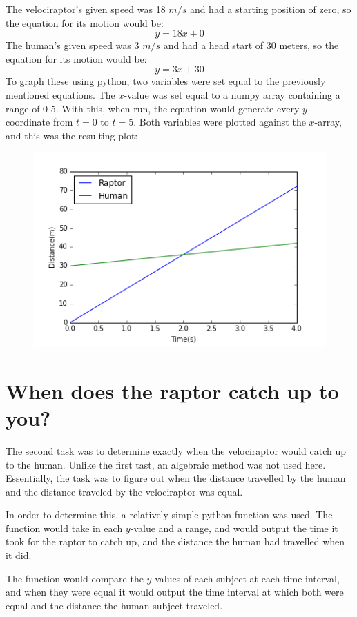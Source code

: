 \documentclass[twocolumn]{revtex4}
\begin{document}
	The velociraptor's given speed was 18 $m/s$ and had a starting position of zero, so the equation for its motion would be:
	$$y=18x+0$$
	The human's given speed was 3 $m/s$ and had a head start of 30 meters, so the equation for its motion would be:
	$$y=3x+30$$
	To graph these using python, two variables were set equal to the previously mentioned equations. The $x$-value was set equal to a numpy array containing a range of 0-5. With this, when run, the equation would generate every $y$-coordinate from $t=0$ to $t=5$. Both variables were plotted against the $x$-array, and this was the resulting plot:
	\begin{figure}
		\centering
		\includegraphics[width=.9\linewidth]{./graph1}
		\label{fig:graph1}
	\end{figure}
\section{When does the raptor catch up to you?}

	The second task was to determine exactly when the velociraptor would catch up to the human. Unlike the first tast, an algebraic method was not used here. Essentially, the task was to figure out when the distance travelled by the human and the distance traveled by the velociraptor was equal.
	
	In order to determine this, a relatively simple python function was used. The function would take in each $y$-value and a range, and would output the time it took for the raptor to catch up, and the distance the human had travelled when it did.
	
	The function would compare the $y$-values of each subject at each time interval, and when they were equal it would output the time interval at which both were equal and the distance the human subject traveled.
	
\end{document}
